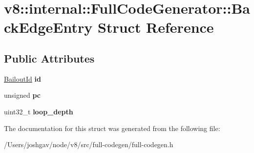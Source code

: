 \hypertarget{structv8_1_1internal_1_1_full_code_generator_1_1_back_edge_entry}{}\section{v8\+:\+:internal\+:\+:Full\+Code\+Generator\+:\+:Back\+Edge\+Entry Struct Reference}
\label{structv8_1_1internal_1_1_full_code_generator_1_1_back_edge_entry}
\subsection*{Public Attributes}
\begin{DoxyCompactItemize}
\item 
\hyperlink{classv8_1_1internal_1_1_bailout_id}{Bailout\+Id} {\bfseries id}\hypertarget{structv8_1_1internal_1_1_full_code_generator_1_1_back_edge_entry_a7615cba217b25267fb46ef1297a182a8}{}\label{structv8_1_1internal_1_1_full_code_generator_1_1_back_edge_entry_a7615cba217b25267fb46ef1297a182a8}

\item 
unsigned {\bfseries pc}\hypertarget{structv8_1_1internal_1_1_full_code_generator_1_1_back_edge_entry_a9c3f64821dc030987fee07f054a41f55}{}\label{structv8_1_1internal_1_1_full_code_generator_1_1_back_edge_entry_a9c3f64821dc030987fee07f054a41f55}

\item 
uint32\+\_\+t {\bfseries loop\+\_\+depth}\hypertarget{structv8_1_1internal_1_1_full_code_generator_1_1_back_edge_entry_a5ecb68672916b955237a8550d9a031ff}{}\label{structv8_1_1internal_1_1_full_code_generator_1_1_back_edge_entry_a5ecb68672916b955237a8550d9a031ff}

\end{DoxyCompactItemize}


The documentation for this struct was generated from the following file\+:\begin{DoxyCompactItemize}
\item 
/\+Users/joshgav/node/v8/src/full-\/codegen/full-\/codegen.\+h\end{DoxyCompactItemize}
